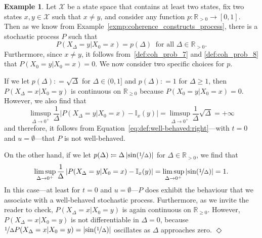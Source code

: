 \documentclass[10pt,a4paper]{paper}
\theoremstyle{definition}
\newtheorem{exmp}{Example}%
\newcommand{\reals}{\mathbb{R}}
\newcommand{\realspos}{\reals_{>0}}
\newcommand{\states}{\mathcal{X}}
\newcommand{\ind}[1]{\mathbb{I}_{#1}}
\newcommand{\abs}[1]{\left\vert #1 \right\vert}
\newcommand{\coloneqq}{:\!=}
\newcommand{\exampleend}{\hfill$\Diamond$}
\begin{document}






\begin{exmp}\label{exmp:well-behaved}
Let $\states$ be a state space that contains at least two states, fix two states $x,y\in\states$ such that $x\neq y$, and consider any function $p:\reals_{>0}\to[0,1]$. Then as we know from Example~\ref{exmp:coherence_constructs_process}, there is a stochastic process $P$ such that
\begin{equation*}
P(X_\Delta=y\vert X_0=x)=p(\Delta)
~\text{ for all $\Delta\in\realspos$.}
\end{equation*}
Furthermore, since $x\neq y$, it follows from~\ref{def:coh_prob_7} and \ref{def:coh_prob_8} that $P(X_0=y\vert X_0=x)=0$. We now consider two specific choices for $p$.

If we let $p(\Delta)\coloneqq\sqrt\Delta$ for $\Delta\in(0,1]$ and $p(\Delta)\coloneqq 1$ for $\Delta\geq1$, then $P(X_\Delta=x\vert X_0=y)$ is continuous on $\reals_{\geq0}$ because $P(X_0=y\vert X_0=x)=0$. However, we also find that
\begin{equation*}
\limsup_{\Delta\to0^+}\frac{1}{\Delta}\abs{P(X_{\Delta}=y\vert X_{0}=x) - \ind{x}(y)}
=
\limsup_{\Delta\to0^+}\frac{1}{\Delta}\sqrt\Delta
=+\infty
\end{equation*}
and therefore, it follows from Equation~\eqref{eq:def:well-behaved:right}---with $t=0$ and $u=\emptyset$---that $P$ is not well-behaved.

On the other hand, if we let $p(\Delta)\coloneqq \Delta\abs{\sin(\nicefrac{1}{\Delta})}$ for $\Delta\in\realspos$, we find that
\begin{equation*}
\limsup_{\Delta\to0^+}\frac{1}{\Delta}\abs{P(X_{\Delta}=y\vert X_{0}=x) - \ind{x}(y)}
=
\limsup_{\Delta\to0^+}\abs{\sin(\nicefrac{1}{\Delta})}
=1.
\end{equation*}
In this case---at least for $t=0$ and $u=\emptyset$---$P$ does exhibit the behaviour that we associate with a well-behaved stochastic process. Furthermore, as we invite the reader to check, $P(X_\Delta=x\vert X_0=y)$ is again continuous on $\reals_{\geq0}$. However, $P(X_\Delta=x\vert X_0=y)$ is not differentiable in $\Delta=0$, because $\nicefrac{1}{\Delta}P(X_\Delta=x\vert X_0=y)=\abs{\sin(\nicefrac{1}{\Delta})}$ oscillates as $\Delta$ approaches zero.
\exampleend
\end{exmp}
\end{document}
